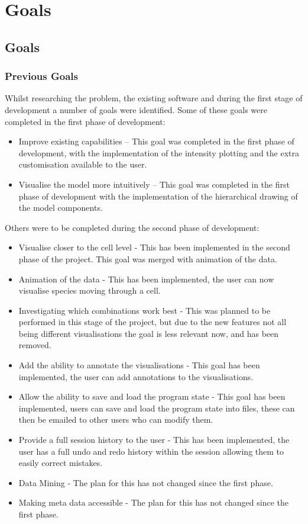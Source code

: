 \chapter{Goals}
\section{Goals}

\subsection{Previous Goals}
Whilst researching the problem, the existing software and during the first stage of development a number of goals were identified.  Some of these goals were completed in the first phase of development:

\begin{itemize}
\item Improve existing capabilities -- This goal was completed in the first phase of development, with the implementation of the intensity plotting and the extra customisation available to the user.
\item Visualise the model more intuitively -- This goal was completed in the first phase of development with the implementation of the hierarchical drawing of the model components.
\end{itemize}

Others were to be completed during the second phase of development:

\begin{itemize}
\item Visualise closer to the cell level - This has been implemented in the second phase of the project.  This goal was merged with animation of the data.
\item Animation of the data - This has been implemented, the user can now visualise species moving through a cell.
\item Investigating which combinations work best - This was planned to be performed in this stage of the project, but due to the new features not all being different visualisations the goal is less relevant now, and has been removed.
\item Add the ability to annotate the visualisations - This goal has been implemented, the user can add annotations to the visualisations.
\item Allow the ability to save and load the program state - This goal has been implemented, users can save and load the program state into files, these can then be emailed to other users who can modify them.
\item Provide a full session history to the user - This has been implemented, the user has a full undo and redo history within the session allowing them to easily correct mistakes.
\item Data Mining - The plan for this has not changed since the first phase.
\item Making meta data accessible - The plan for this has not changed since the first phase.
\end{itemize}

